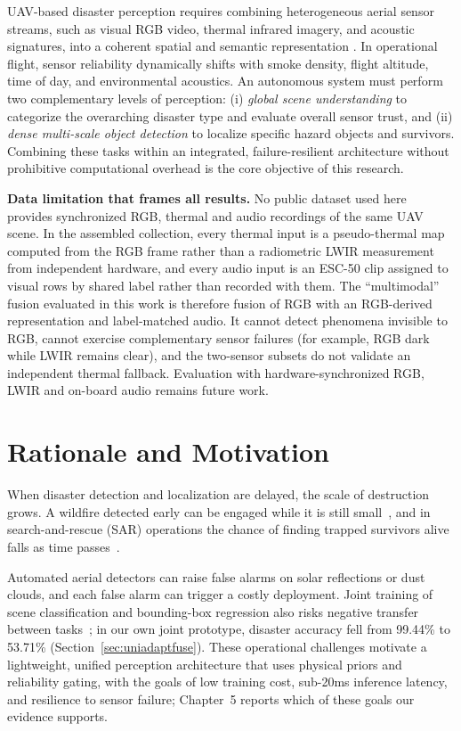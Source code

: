 UAV-based disaster perception requires combining heterogeneous aerial sensor streams, such as visual RGB video, thermal infrared imagery, and acoustic signatures, into a coherent spatial and semantic representation \cite{merino2012unmanned, baltrusaitis2019multimodal}. In operational flight, sensor reliability dynamically shifts with smoke density, flight altitude, time of day, and environmental acoustics. An autonomous system must perform two complementary levels of perception: (i) \textit{global scene understanding} to categorize the overarching disaster type and evaluate overall sensor trust, and (ii) \textit{dense multi-scale object detection} to localize specific hazard objects and survivors. Combining these tasks within an integrated, failure-resilient architecture without prohibitive computational overhead is the core objective of this research.

\textbf{Data limitation that frames all results.} No public dataset used here provides synchronized RGB, thermal and audio recordings of the same UAV scene. In the assembled collection, every thermal input is a pseudo-thermal map computed from the RGB frame rather than a radiometric LWIR measurement from independent hardware, and every audio input is an ESC-50 clip assigned to visual rows by shared label rather than recorded with them. The ``multimodal'' fusion evaluated in this work is therefore fusion of RGB with an RGB-derived representation and label-matched audio. It cannot detect phenomena invisible to RGB, cannot exercise complementary sensor failures (for example, RGB dark while LWIR remains clear), and the two-sensor subsets do not validate an independent thermal fallback. Evaluation with hardware-synchronized RGB, LWIR and on-board audio remains future work.

\section{Rationale and Motivation}

When disaster detection and localization are delayed, the scale of destruction grows. A wildfire detected early can be engaged while it is still small~\cite{merino2012unmanned}, and in search-and-rescue (SAR) operations the chance of finding trapped survivors alive falls as time passes~\cite{erdelj2017help}.

Automated aerial detectors can raise false alarms on solar reflections or dust clouds, and each false alarm can trigger a costly deployment. Joint training of scene classification and bounding-box regression also risks negative transfer between tasks~\cite{yu2020gradient}; in our own joint prototype, disaster accuracy fell from 99.44\% to 53.71\% (Section~\ref{sec:uniadaptfuse}). These operational challenges motivate a lightweight, unified perception architecture that uses physical priors and reliability gating, with the goals of low training cost, sub-20ms inference latency, and resilience to sensor failure; Chapter~5 reports which of these goals our evidence supports.


